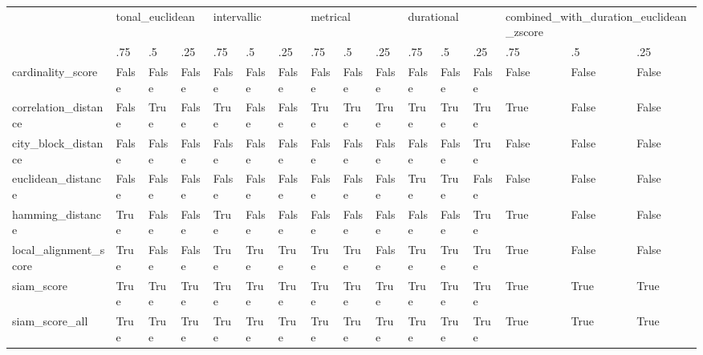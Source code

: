 \begin{tabular}{llllllllllllllll}
\toprule
{} & \multicolumn{3}{l}{tonal\_euclidean} & \multicolumn{3}{l}{intervallic} & \multicolumn{3}{l}{metrical} & \multicolumn{3}{l}{durational} & \multicolumn{3}{l}{combined\_with\_duration\_euclidean\_zscore} \\
{} & .75 & .5 & .25 & .75 & .5 & .25 & .75 & .5 & .25 & .75 & .5 & .25 & .75 & .5 & .25 \\
\midrule
cardinality\_score     & False & False & False & False & False & False & False & False & False & False & False & False & False & False & False \\
correlation\_distance  & False & True & False & True & False & False & True & True & True & True & True & True & True & False & False \\
city\_block\_distance   & False & False & False & False & False & False & False & False & False & False & False & True & False & False & False \\
euclidean\_distance    & False & False & False & False & False & False & False & False & False & True & True & False & False & False & False \\
hamming\_distance      & True & False & False & True & False & False & False & False & False & False & False & True & True & False & False \\
local\_alignment\_score & True & False & False & True & True & True & True & True & False & True & True & True & True & False & False \\
siam\_score            & True & True & True & True & True & True & True & True & True & True & True & True & True & True & True \\
siam\_score\_all        & True & True & True & True & True & True & True & True & True & True & True & True & True & True & True \\
\bottomrule
\end{tabular}
